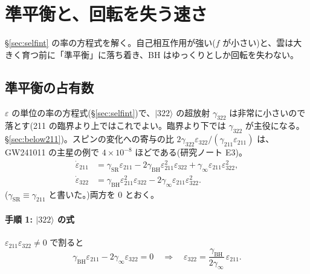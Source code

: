\section{準平衡と、回転を失う速さ}\label{sec:equilibrium}

\S\ref{sec:selfint} の率の方程式を解く。自己相互作用が強い($f$ が小さい)と、雲は大きく育つ前に「準平衡」に落ち着き、BH はゆっくりとしか回転を失わない。

\subsection{準平衡の占有数}

$\varepsilon$ の単位の率の方程式(\S\ref{sec:selfint})で、$|322\rangle$ の超放射 $\gamma_{322}$ は非常に小さいので落とす(211 の臨界より上ではこれでよい。臨界より下では $\gamma_{322}$ が主役になる。\S\ref{sec:below211})。スピンの変化への寄与の比 $2\gamma_{322}\varepsilon_{322}/(\gamma_{211}\varepsilon_{211})$ は、GW241011 の主星の例で $4\times10^{-8}$ ほどである(研究ノート E3)。
\begin{align}
\dot\varepsilon_{211}&=\gamma_\mathrm{SR}\varepsilon_{211}-2\gamma_\mathrm{BH}\varepsilon_{211}^2\varepsilon_{322}+\gamma_\infty\varepsilon_{211}\varepsilon_{322}^2,\\
\dot\varepsilon_{322}&=\gamma_\mathrm{BH}\varepsilon_{211}^2\varepsilon_{322}-2\gamma_\infty\varepsilon_{211}\varepsilon_{322}^2.
\end{align}
($\gamma_\mathrm{SR}\equiv\gamma_{211}$ と書いた。)両方を 0 とおく。

\paragraph{手順 1: $|322\rangle$ の式}
$\varepsilon_{211}\varepsilon_{322}\ne0$ で割ると
\begin{equation}
\gamma_\mathrm{BH}\varepsilon_{211}-2\gamma_\infty\varepsilon_{322}=0
\quad\Longrightarrow\quad
\varepsilon_{322}=\frac{\gamma_\mathrm{BH}}{2\gamma_\infty}\,\varepsilon_{211}.
\label{eq:eq322}
\end{equation}

